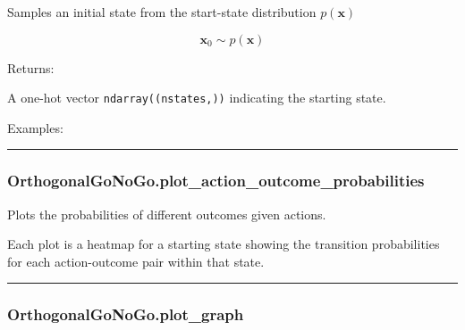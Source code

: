 Samples an initial state from the start-state distribution
\(p(\mathbf x)\)

\[
\mathbf x_0 \sim p(\mathbf x)
\]

Returns:

A one-hot vector \texttt{ndarray((nstates,))} indicating the starting
state.

Examples:

\begin{Shaded}
\begin{Highlighting}[]
\OperatorTok{=}
\end{Highlighting}
\end{Shaded}

\begin{center}\rule{0.5\linewidth}{\linethickness}\end{center}

\subsubsection{OrthogonalGoNoGo.plot\_action\_outcome\_probabilities}\label{orthogonalgonogo.plot_action_outcome_probabilities}

\begin{Shaded}
\begin{Highlighting}[]
\OperatorTok{=}\OperatorTok{=}\OperatorTok{=}\OperatorTok{=}\NormalTok{)}
\end{Highlighting}
\end{Shaded}

Plots the probabilities of different outcomes given actions.

Each plot is a heatmap for a starting state showing the transition
probabilities for each action-outcome pair within that state.

\begin{center}\rule{0.5\linewidth}{\linethickness}\end{center}

\subsubsection{OrthogonalGoNoGo.plot\_graph}\label{orthogonalgonogo.plot_graph}

\begin{Shaded}
\begin{Highlighting}[]
\OperatorTok{=}\OperatorTok{=}\OperatorTok{=}\OperatorTok{=}\OperatorTok{=}\OperatorTok{=}\OperatorTok{=}\OperatorTok{=}\NormalTok{)}
\end{Highlighting}
\end{Shaded}

